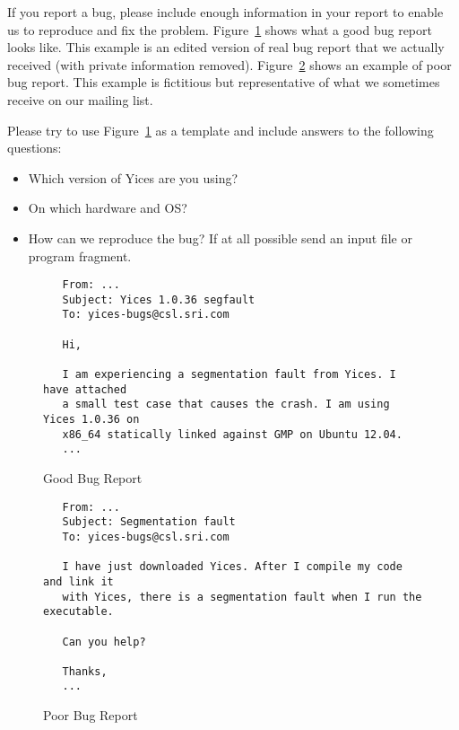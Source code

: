 \documentclass[11pt,twoside,fleqn,openright,titlepage]{cslreport}
\begin{document}
If you report a bug, please include enough information in your report
to enable us to reproduce and fix the
problem. Figure~\ref{good-report} shows what a good bug report looks
like. This example is an edited version of real bug report that we
actually received (with private information
removed). Figure~\ref{bad-report} shows an example of poor bug
report. This example is fictitious but representative of what we
sometimes receive on our mailing list.

Please try to use Figure~\ref{good-report} as a template and include
answers to the following questions:
\begin{itemize}
\item Which version of Yices are you using?
\item On which hardware and OS?
\item How can we reproduce the bug? If at all possible send an input file
or program fragment.
\end{itemize}


\begin{figure}
\begin{center}
\begin{footnotesize}
\begin{verbatim}
   From: ...
   Subject: Yices 1.0.36 segfault
   To: yices-bugs@csl.sri.com

   Hi,

   I am experiencing a segmentation fault from Yices. I have attached
   a small test case that causes the crash. I am using Yices 1.0.36 on
   x86_64 statically linked against GMP on Ubuntu 12.04.
   ...
\end{verbatim}
\end{footnotesize}
\end{center}
\caption{Good Bug Report}
\label{good-report}
\end{figure}

\begin{figure}
\begin{center}
\begin{footnotesize}
\begin{verbatim}
   From: ...
   Subject: Segmentation fault
   To: yices-bugs@csl.sri.com

   I have just downloaded Yices. After I compile my code and link it
   with Yices, there is a segmentation fault when I run the executable.

   Can you help?

   Thanks,
   ...
\end{verbatim}
\end{footnotesize}
\end{center}
\caption{Poor Bug Report}
\label{bad-report}
\end{figure}
\end{document}
